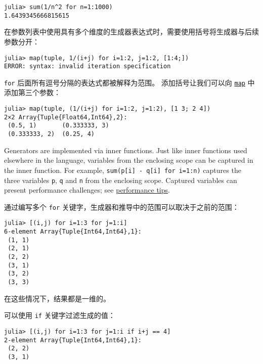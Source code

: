 \begin{verbatim}
julia> sum(1/n^2 for n=1:1000)
1.6439345666815615
\end{verbatim}



在参数列表中使用具有多个维度的生成器表达式时，需要使用括号将生成器与后续参数分开：




\begin{verbatim}
julia> map(tuple, 1/(i+j) for i=1:2, j=1:2, [1:4;])
ERROR: syntax: invalid iteration specification
\end{verbatim}



\texttt{for} 后面所有逗号分隔的表达式都被解释为范围。 添加括号让我们可以向 \hyperlink{11483231213869150535}{\texttt{map}} 中添加第三个参数：




\begin{verbatim}
julia> map(tuple, (1/(i+j) for i=1:2, j=1:2), [1 3; 2 4])
2×2 Array{Tuple{Float64,Int64},2}:
 (0.5, 1)       (0.333333, 3)
 (0.333333, 2)  (0.25, 4)
\end{verbatim}



Generators are implemented via inner functions. Just like inner functions used elsewhere in the language, variables from the enclosing scope can be {\textquotedbl}captured{\textquotedbl} in the inner function.  For example, \texttt{sum(p[i] - q[i] for i=1:n)} captures the three variables \texttt{p}, \texttt{q} and \texttt{n} from the enclosing scope. Captured variables can present performance challenges; see \hyperlink{627547588659365489}{performance tips}.



通过编写多个 \texttt{for} 关键字，生成器和推导中的范围可以取决于之前的范围：




\begin{verbatim}
julia> [(i,j) for i=1:3 for j=1:i]
6-element Array{Tuple{Int64,Int64},1}:
 (1, 1)
 (2, 1)
 (2, 2)
 (3, 1)
 (3, 2)
 (3, 3)
\end{verbatim}



在这些情况下，结果都是一维的。



可以使用 \texttt{if} 关键字过滤生成的值：




\begin{verbatim}
julia> [(i,j) for i=1:3 for j=1:i if i+j == 4]
2-element Array{Tuple{Int64,Int64},1}:
 (2, 2)
 (3, 1)
\end{verbatim}




